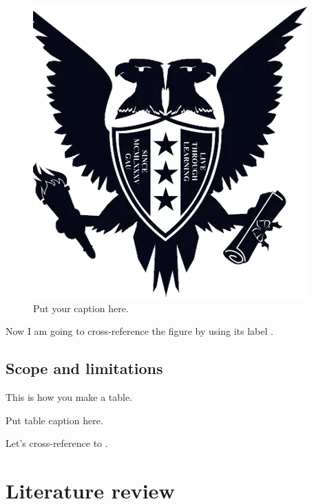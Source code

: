 \documentclass{template}
\begin{document}
\begin{figure}
\includegraphics[scale=0.2]{logo}
\caption{Put your caption here.}
\label{fig:logo}
\end{figure}

Now I am going to cross-reference the figure by using its label .

\section{Scope and limitations}

This is how you make a table.

\begin{table}
\caption{Put table caption here.}
\label{tab:city}
\end{table}

Let's cross-reference to .

\chapter{Literature review}\label{ch:lr}
\end{document}
